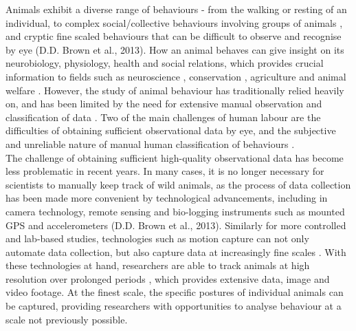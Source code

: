 \documentclass[11pt, letterpaper]{article} %
\begin{document}
    Animals exhibit a diverse range of behaviours - from the walking or resting of an individual, to complex social/collective behaviours involving groups of animals \citep{collective_2005, hughey_challenges_2018}, and cryptic fine scaled behaviours that can be difficult to observe and recognise by eye (D.D. Brown et al., 2013). How an animal behaves can give insight on its neurobiology, physiology, health and social relations, which provides crucial information to fields such as neuroscience \citep{datta_computational_2019, mathis_deeplearning_2020}, conservation \citep{panda_2021}, agriculture \citep{locust_2024} and animal welfare \citep{animal_welfare_2016}. However, the study of animal behaviour has traditionally relied heavily on, and has been limited by the need for extensive manual observation and classification of data \citep{anderson_comp_ethology_2014}. Two of the main challenges of human labour are the difficulties of obtaining sufficient observational data by eye, and the subjective and unreliable nature of manual human classification of behaviours \citep{anderson_comp_ethology_2014, segalin_mouse_2021}. \\
    
    \noindent The challenge of obtaining sufficient high-quality observational data has become less problematic in recent years. In many cases, it is no longer necessary for scientists to manually keep track of wild animals, as the process of data collection has been made more convenient by technological advancements, including in camera technology, remote sensing \citep{torney_caribou_remotesensing_2018} and bio-logging instruments such as mounted GPS \citep{kays_GPS_2015} and accelerometers (D.D. Brown et al., 2013). Similarly for more controlled and lab-based studies, technologies such as motion capture can not only automate data collection, but also capture data at increasingly fine scales \citep{nagy_smart-barn_2023}. 
    With these technologies at hand, researchers are able to track animals at high resolution over prolonged periods \citep{hughey_challenges_2018}, which provides extensive data, image and video footage. At the finest scale, the specific postures of individual animals can be captured, providing researchers with opportunities to analyse behaviour at a scale not previously possible. \\
\end{document}
